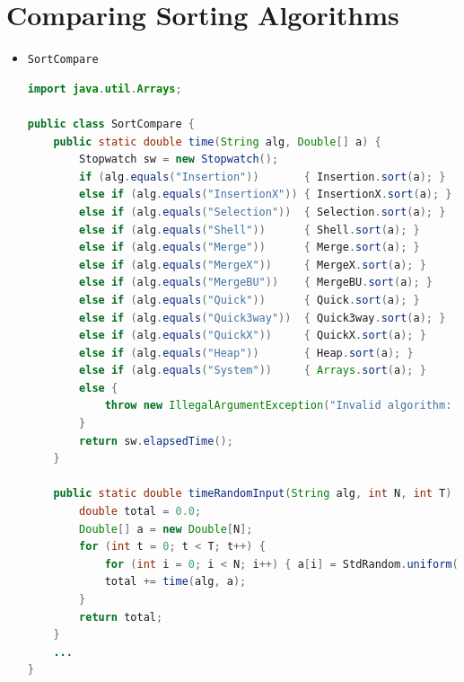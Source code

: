 \documentclass[8pt,a4paper,compress]{beamer}
\begin{document}
\section{Comparing Sorting Algorithms}
\begin{frame}[fragile]
\begin{itemize}
\item \lstinline{SortCompare}
\begin{lstlisting}[language=Java]
import java.util.Arrays;

public class SortCompare { 
    public static double time(String alg, Double[] a) { 
        Stopwatch sw = new Stopwatch(); 
        if (alg.equals("Insertion"))       { Insertion.sort(a); }
        else if (alg.equals("InsertionX")) { InsertionX.sort(a); }
        else if (alg.equals("Selection"))  { Selection.sort(a); }
        else if (alg.equals("Shell"))      { Shell.sort(a); }
        else if (alg.equals("Merge"))      { Merge.sort(a); }
        else if (alg.equals("MergeX"))     { MergeX.sort(a); }
        else if (alg.equals("MergeBU"))    { MergeBU.sort(a); } 
        else if (alg.equals("Quick"))      { Quick.sort(a); }
        else if (alg.equals("Quick3way"))  { Quick3way.sort(a); }
        else if (alg.equals("QuickX"))     { QuickX.sort(a); }
        else if (alg.equals("Heap"))       { Heap.sort(a); }
        else if (alg.equals("System"))     { Arrays.sort(a); }
        else {
            throw new IllegalArgumentException("Invalid algorithm: " + alg);
        }
        return sw.elapsedTime(); 
    } 

    public static double timeRandomInput(String alg, int N, int T)  {
        double total = 0.0; 
        Double[] a = new Double[N]; 
        for (int t = 0; t < T; t++) {
            for (int i = 0; i < N; i++) { a[i] = StdRandom.uniform(); }
            total += time(alg, a); 
        } 
        return total; 
    }
    ... 
}
\end{lstlisting}
\end{itemize}
\end{frame}
\end{document}
